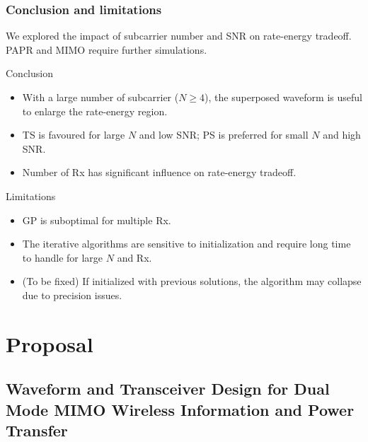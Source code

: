 \documentclass{beamer}
\begin{document}
\begin{frame}
\frametitle{Conclusion and limitations}

We explored the impact of subcarrier number and SNR on rate-energy tradeoff. PAPR and MIMO require further simulations.

\begin{block}{Conclusion}
\begin{itemize}
  \item With a large number of subcarrier ($N \geqslant 4$), the superposed waveform is useful to enlarge the rate-energy region.
  \item TS is favoured for large $N$ and low SNR; PS is preferred for small $N$ and high SNR.
  \item Number of Rx has significant influence on rate-energy tradeoff.
\end{itemize}
\end{block}

\begin{block}{Limitations}
\begin{itemize}
  \item GP is suboptimal for multiple Rx.
  \item The iterative algorithms are sensitive to initialization and require long time to handle for large $N$ and Rx.
  \item (To be fixed) If initialized with previous solutions, the algorithm may collapse due to precision issues.
\end{itemize}
\end{block}

\end{frame}



\section{Proposal}
\subsection{Waveform and Transceiver Design for Dual Mode MIMO Wireless Information and Power Transfer}
\end{document}

